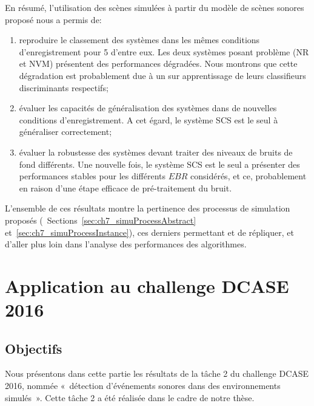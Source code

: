 En résumé, l'utilisation des scènes simulées à partir du modèle de scènes sonores proposé nous a permis de:

\begin{enumerate}
\item reproduire le classement des systèmes dans les mêmes conditions d'enregistrement pour 5 d'entre eux. Les deux systèmes posant problème (NR et NVM) présentent des performances dégradées. Nous montrons que cette dégradation est probablement due à un sur apprentissage de leurs classifieurs discriminants respectifs;
\item évaluer les capacités de généralisation des systèmes dans de nouvelles conditions d'enregistrement. A cet égard, le système SCS est le seul à généraliser correctement;
\item évaluer la robustesse des systèmes devant traiter des niveaux de bruits de fond différents. Une nouvelle fois, le système SCS est le seul a présenter des performances stables pour les différents $EBR$ considérés, et ce, probablement en raison d'une étape efficace de pré-traitement du bruit.
\end{enumerate}

L'ensemble de ces résultats montre la pertinence des processus de simulation proposés (\cf~Sections~\ref{sec:ch7_simuProcessAbstract} et~\ref{sec:ch7_simuProcessInstance}), ces derniers permettant et de répliquer, et d'aller plus loin dans l'analyse des performances des algorithmes.


\section{Application au challenge DCASE  2016}
\label{sec:ch5_appDcase2016}

\subsection{Objectifs}

Nous présentons dans cette partie les résultats de la tâche 2 du challenge DCASE 2016, nommée «~détection d'événements sonores dans des environnements simulés~». Cette tâche 2 a été réalisée dans le cadre de notre thèse. 

